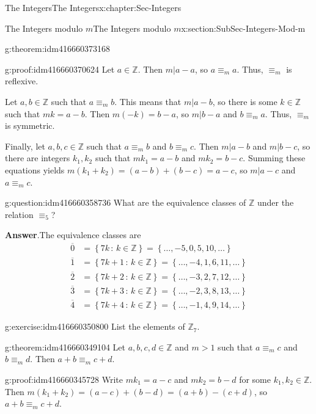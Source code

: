 \documentclass[oneside,10pt,]{book}
\numberwithin{equation}{section}
\newcommand{\set}[1]{\left\{ {#1} \right\}}
\newcommand{\setof}[2]{{\left\{#1\,\colon\,#2\right\}}}
\def\Z{{\mathbb Z}}
\newcommand{\amp}{&}
\begin{document}
\begin{chapterptx}{The Integers}{}{The Integers}{}{}{x:chapter:Sec-Integers}
\begin{sectionptx}{The Integers modulo \(m\)}{}{The Integers modulo \(m\)}{}{}{x:section:SubSec-Integers-Mod-m}
\begin{theorem}{}{}{g:theorem:idm416660373168}
\end{theorem}
\begin{proofptx}{}{g:proof:idm416660370624}
Let \(a\in \Z\). Then \(m|a-a\), so \(a \equiv_m a\). Thus, \(\equiv_m\) is reflexive.%
\par
Let \(a,b\in \Z\) such that \(a\equiv_m b\). This means that \(m|a-b\), so there is some \(k\in \Z\) such that \(mk = a-b\). Then \(m(-k) = b-a\), so \(m|b-a\) and \(b \equiv_m a\). Thus, \(\equiv_m\) is symmetric.%
\par
Finally, let \(a,b,c\in \Z\) such that \(a\equiv_m b\) and \(b\equiv_m c\). Then \(m|a-b\) and \(m|b-c\), so there are integers \(k_1, k_2\) such that \(m k_1 = a-b\) and \(m k_2 = b-c\). Summing these equations yields \(m(k_1 + k_2) = (a-b) + (b-c) = a-c\), so \(m|a-c\) and \(a\equiv_m c\).%
\end{proofptx}
\begin{question}{}{g:question:idm416660358736}%
What are the equivalence classes of \(\Z\) under the relation \(\equiv_5\)?%
\par\smallskip%
\noindent\textbf{Answer}.\hypertarget{g:answer:idm416660356752}{}\quad{}The equivalence classes are%
\begin{align*}
\overline{0} \amp = \setof{7k}{k\in\Z} = \set{\ldots, -5, 0, 5, 10, \ldots}\\
\overline{1} \amp = \setof{7k+1}{k\in\Z} = \set{\ldots, -4, 1, 6, 11, \ldots}\\
\overline{2} \amp = \setof{7k+2}{k\in\Z} = \set{\ldots, -3, 2, 7, 12, \ldots}\\
\overline{3} \amp = \setof{7k+3}{k\in\Z} = \set{\ldots, -2, 3, 8, 13, \ldots}\\
\overline{4} \amp = \setof{7k+4}{k\in\Z} = \set{\ldots, -1, 4, 9, 14, \ldots}
\end{align*}
%
\end{question}
\label{g:notation:idm416660352912}%
\begin{inlineexercise}{}{g:exercise:idm416660350800}%
List the elements of \(\Z_7\).%
\end{inlineexercise}
\begin{theorem}{}{}{g:theorem:idm416660349104}%
Let \(a,b, c,d\in \Z\) and \(m > 1\) such that \(a\equiv_m c\) and \(b\equiv_m d\). Then \(a+b \equiv_m c + d\).%
\end{theorem}
\begin{proofptx}{}{g:proof:idm416660345728}
Write \(mk_1 = a-c\) and \(m k_2 = b-d\) for some \(k_1,k_2\in \Z\). Then \(m(k_1 + k_2) = (a-c) + (b-d) = (a+b) - (c+d)\), so \(a+b \equiv_m c+d\).%

\end{proofptx}
\end{sectionptx}
\end{chapterptx}
\end{document}
